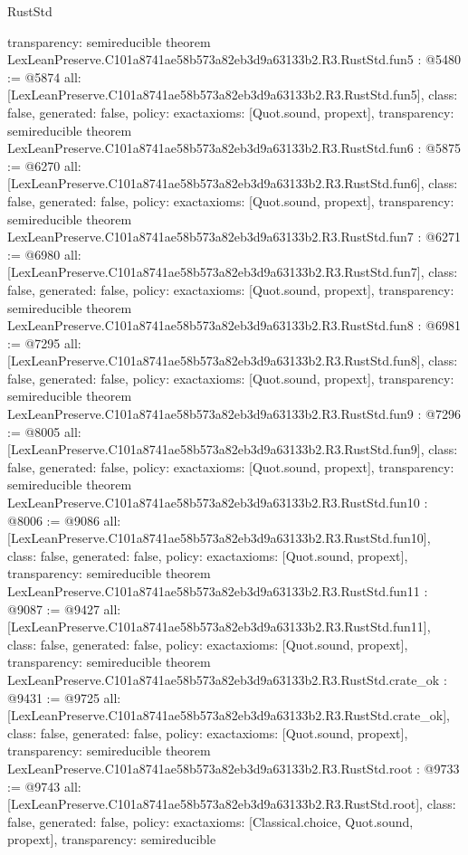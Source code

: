 \begin{lexlean}{RustStd}
\begin{coremodule}
{  transparency: semireducible
}
theorem LexLeanPreserve.C101a8741ae58b573a82eb3d9a63133b2.R3.RustStd.fun5 : @5480 := @5874 {
  all: [LexLeanPreserve.C101a8741ae58b573a82eb3d9a63133b2.R3.RustStd.fun5],
  class: false,
  generated: false,
  policy: exact{axioms: [Quot.sound, propext]},
  transparency: semireducible
}
theorem LexLeanPreserve.C101a8741ae58b573a82eb3d9a63133b2.R3.RustStd.fun6 : @5875 := @6270 {
  all: [LexLeanPreserve.C101a8741ae58b573a82eb3d9a63133b2.R3.RustStd.fun6],
  class: false,
  generated: false,
  policy: exact{axioms: [Quot.sound, propext]},
  transparency: semireducible
}
theorem LexLeanPreserve.C101a8741ae58b573a82eb3d9a63133b2.R3.RustStd.fun7 : @6271 := @6980 {
  all: [LexLeanPreserve.C101a8741ae58b573a82eb3d9a63133b2.R3.RustStd.fun7],
  class: false,
  generated: false,
  policy: exact{axioms: [Quot.sound, propext]},
  transparency: semireducible
}
theorem LexLeanPreserve.C101a8741ae58b573a82eb3d9a63133b2.R3.RustStd.fun8 : @6981 := @7295 {
  all: [LexLeanPreserve.C101a8741ae58b573a82eb3d9a63133b2.R3.RustStd.fun8],
  class: false,
  generated: false,
  policy: exact{axioms: [Quot.sound, propext]},
  transparency: semireducible
}
theorem LexLeanPreserve.C101a8741ae58b573a82eb3d9a63133b2.R3.RustStd.fun9 : @7296 := @8005 {
  all: [LexLeanPreserve.C101a8741ae58b573a82eb3d9a63133b2.R3.RustStd.fun9],
  class: false,
  generated: false,
  policy: exact{axioms: [Quot.sound, propext]},
  transparency: semireducible
}
theorem LexLeanPreserve.C101a8741ae58b573a82eb3d9a63133b2.R3.RustStd.fun10 : @8006 := @9086 {
  all: [LexLeanPreserve.C101a8741ae58b573a82eb3d9a63133b2.R3.RustStd.fun10],
  class: false,
  generated: false,
  policy: exact{axioms: [Quot.sound, propext]},
  transparency: semireducible
}
theorem LexLeanPreserve.C101a8741ae58b573a82eb3d9a63133b2.R3.RustStd.fun11 : @9087 := @9427 {
  all: [LexLeanPreserve.C101a8741ae58b573a82eb3d9a63133b2.R3.RustStd.fun11],
  class: false,
  generated: false,
  policy: exact{axioms: [Quot.sound, propext]},
  transparency: semireducible
}
theorem LexLeanPreserve.C101a8741ae58b573a82eb3d9a63133b2.R3.RustStd.crate_ok : @9431 := @9725 {
  all: [LexLeanPreserve.C101a8741ae58b573a82eb3d9a63133b2.R3.RustStd.crate_ok],
  class: false,
  generated: false,
  policy: exact{axioms: [Quot.sound, propext]},
  transparency: semireducible
}
theorem LexLeanPreserve.C101a8741ae58b573a82eb3d9a63133b2.R3.RustStd.root : @9733 := @9743 {
  all: [LexLeanPreserve.C101a8741ae58b573a82eb3d9a63133b2.R3.RustStd.root],
  class: false,
  generated: false,
  policy: exact{axioms: [Classical.choice, Quot.sound, propext]},
  transparency: semireducible
}


\end{coremodule}
\end{lexlean}
